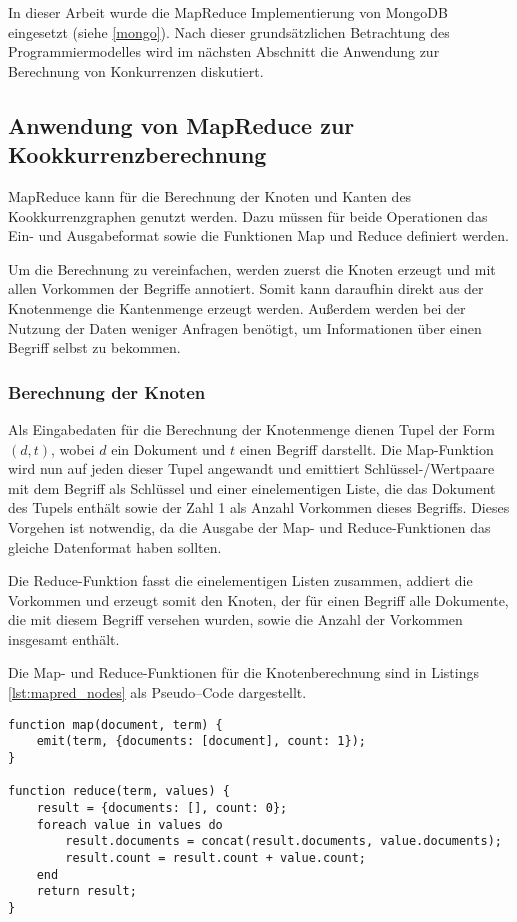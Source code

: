 In dieser Arbeit wurde die MapReduce Implementierung von MongoDB eingesetzt (siehe \ref{mongo}). Nach dieser grundsätzlichen Betrachtung des Programmiermodelles wird im nächsten Abschnitt die Anwendung zur Berechnung von Konkurrenzen diskutiert.

\subsection{Anwendung von MapReduce zur Kookkurrenzberechnung}
\label{mapreduce_cooccurence}

MapReduce kann für die Berechnung der Knoten und Kanten des Kookkurrenzgraphen genutzt werden. Dazu müssen für beide Operationen das Ein- und Ausgabeformat sowie die Funktionen Map und Reduce definiert werden.

Um die Berechnung zu vereinfachen, werden zuerst die Knoten erzeugt und mit allen Vorkommen der Begriffe annotiert. Somit kann daraufhin direkt aus der Knotenmenge die Kantenmenge erzeugt werden. Außerdem werden bei der Nutzung der Daten weniger Anfragen benötigt, um Informationen über einen Begriff selbst zu bekommen.

\subsubsection{Berechnung der Knoten}

Als Eingabedaten für die Berechnung der Knotenmenge dienen Tupel der Form \((d, t)\), wobei \(d\) ein Dokument und \(t\) einen Begriff darstellt. Die Map-Funktion wird nun auf jeden dieser Tupel angewandt und emittiert Schlüssel-/Wertpaare mit dem Begriff als Schlüssel und einer einelementigen Liste, die das Dokument des Tupels enthält sowie der Zahl \num{1} als Anzahl Vorkommen dieses Begriffs. Dieses Vorgehen ist notwendig, da die Ausgabe der Map- und Reduce-Funktionen das gleiche Datenformat haben sollten.

Die Reduce-Funktion fasst die einelementigen Listen zusammen, addiert die Vorkommen und erzeugt somit den Knoten, der für einen Begriff alle Dokumente, die mit diesem Begriff versehen wurden, sowie die Anzahl der Vorkommen insgesamt enthält.

Die Map- und Reduce-Funktionen für die Knotenberechnung sind in Listings \ref{lst:mapred_nodes} als Pseudo--Code dargestellt.

\begin{lstlisting}[language=pseudo, label={lst:mapred_nodes}, caption={Knotenerzeugung mit MapReduce}]
function map(document, term) {
    emit(term, {documents: [document], count: 1});
}

function reduce(term, values) {
    result = {documents: [], count: 0};
    foreach value in values do
        result.documents = concat(result.documents, value.documents);
        result.count = result.count + value.count;
    end
    return result;
}
\end{lstlisting}

